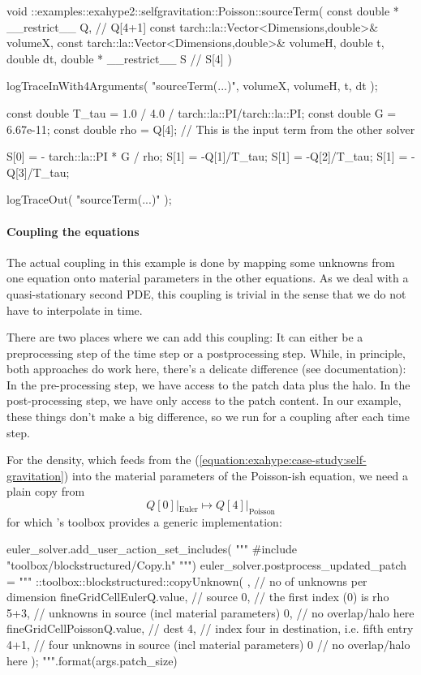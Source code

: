 \begin{code}
void ::examples::exahype2::selfgravitation::Poisson::sourceTerm(
  const double * __restrict__                  Q, // Q[4+1]
  const tarch::la::Vector<Dimensions,double>&  volumeX,
  const tarch::la::Vector<Dimensions,double>&  volumeH,
  double                                       t,
  double                                       dt,
  double * __restrict__                        S  // S[4]
) {
  logTraceInWith4Arguments( "sourceTerm(...)", volumeX, volumeH, t, dt );

  const double T_tau = 1.0 / 4.0 / tarch::la::PI/tarch::la::PI;
  const double G     = 6.67e-11;
  const double rho   = Q[4]; // This is the input term from the other solver

  S[0] = - tarch::la::PI * G / rho;
  S[1] = -Q[1]/T_tau;
  S[1] = -Q[2]/T_tau;
  S[1] = -Q[3]/T_tau;

  logTraceOut( "sourceTerm(...)" );
}
\end{code}


\paragraph{Coupling the equations}
%
%
%
The actual coupling in this example is done by mapping some unknowns from one 
equation onto material parameters in the other equations.
As we deal with a quasi-stationary second PDE, this coupling is trivial in the 
sense that we do not have to interpolate in time. 


There are two places where we can add this coupling: 
It can either be a preprocessing step of the time step or a postprocessing
step.
While, in principle, both approaches do work here, there's a delicate
difference (see documentation):
In the pre-processing step, we have access to the patch data plus the halo.
In the post-processing step, we have only access to the patch content.
In our example, these things don't make a big difference, so we run for a 
coupling after each time step.


For the density, which feeds from the
(\ref{equation:exahype:case-study:self-gravitation})  into the material
parameters of the Poisson-ish equation, we need a plain copy from 
\[
  Q[0]|_{\text{Euler}} \mapsto   Q[4]|_{\text{Poisson}} 
\]
for which \Peano's toolbox provides a generic implementation:


\begin{code}
euler_solver.add_user_action_set_includes( """
#include "toolbox/blockstructured/Copy.h"
""")
euler_solver.postprocess_updated_patch = """
 ::toolbox::blockstructured::copyUnknown(
   {},      // no of unknowns per dimension
   fineGridCellEulerQ.value, // source
   0,       // the first index (0) is rho
   5+3,     // unknowns in source (incl material parameters)
   0,       // no overlap/halo here
   fineGridCellPoissonQ.value, // dest
   4,       // index four in destination, i.e. fifth entry 
   4+1,     // four unknowns in source (incl material parameters)
   0        // no overlap/halo here
 );
""".format(args.patch_size)
\end{code}

